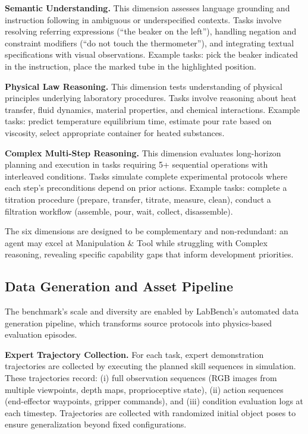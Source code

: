 \documentclass[letterpaper]{article} %
\begin{document}
\textbf{Semantic Understanding.} This dimension assesses language grounding and instruction following in ambiguous or underspecified contexts. Tasks involve resolving referring expressions (``the beaker on the left''), handling negation and constraint modifiers (``do not touch the thermometer''), and integrating textual specifications with visual observations. Example tasks: pick the beaker indicated in the instruction, place the marked tube in the highlighted position.

\textbf{Physical Law Reasoning.} This dimension tests understanding of physical principles underlying laboratory procedures. Tasks involve reasoning about heat transfer, fluid dynamics, material properties, and chemical interactions. Example tasks: predict temperature equilibrium time, estimate pour rate based on viscosity, select appropriate container for heated substances.

\textbf{Complex Multi-Step Reasoning.} This dimension evaluates long-horizon planning and execution in tasks requiring 5+ sequential operations with interleaved conditions. Tasks simulate complete experimental protocols where each step's preconditions depend on prior actions. Example tasks: complete a titration procedure (prepare, transfer, titrate, measure, clean), conduct a filtration workflow (assemble, pour, wait, collect, disassemble).

The six dimensions are designed to be complementary and non-redundant: an agent may excel at Manipulation \& Tool while struggling with Complex reasoning, revealing specific capability gaps that inform development priorities.

\subsection{Data Generation and Asset Pipeline}

The benchmark's scale and diversity are enabled by LabBench's automated data generation pipeline, which transforms source protocols into physics-based evaluation episodes.

\textbf{Expert Trajectory Collection.} For each task, expert demonstration trajectories are collected by executing the planned skill sequences in simulation. These trajectories record: (i) full observation sequences (RGB images from multiple viewpoints, depth maps, proprioceptive state), (ii) action sequences (end-effector waypoints, gripper commands), and (iii) condition evaluation logs at each timestep. Trajectories are collected with randomized initial object poses to ensure generalization beyond fixed configurations.
\end{document}
